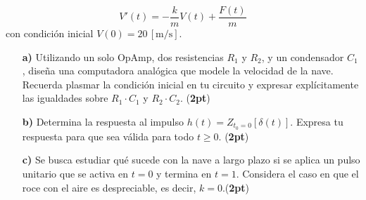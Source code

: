 \documentclass[
	spanish, %
	letterpaper, oneside
]{article}
\begin{document}
\begin{enumerate}
\[
V'(t) = -\frac{k}{m} V(t) + \frac{F(t)}{m}
\]
con condición inicial \( V(0) = 20\,\mathrm{[m/s]} \).

\begin{enumerate}
    \item[\textbf{a)}] Utilizando un solo OpAmp, dos resistencias \( R_1 \) y \( R_2 \), y un condensador \( C_1 \), diseña una computadora analógica que modele la velocidad de la nave. Recuerda plasmar la condición inicial en tu circuito y expresar explícitamente las igualdades sobre \( R_1 \cdot C_1 \) y \( R_2 \cdot C_2 \). (\textbf{2pt})
    \item[\textbf{b)}] Determina la respuesta al impulso \( h(t) = Z_{t_0=0}[\delta(t)] \). Expresa tu respuesta para que sea válida para todo \( t \geq 0 \). (\textbf{2pt})
    \item[\textbf{c)}] Se busca estudiar qué sucede con la nave a largo plazo si se aplica un pulso unitario que se activa en \( t = 0 \) y termina en \( t = 1 \). Considera el caso en que el roce con el aire es despreciable, es decir, \( k = 0 \).(\textbf{2pt})
\end{enumerate}
\end{enumerate}
\end{document}
